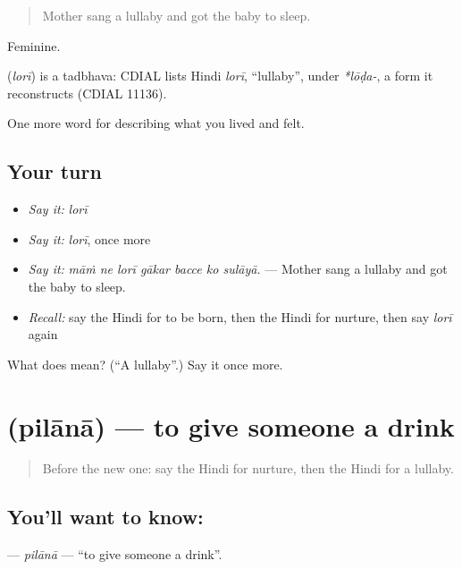 \begin{quote}
Mother sang a lullaby and got the baby to sleep.
\end{quote}

Feminine.

\begin{cousinweb}
\textbf{} (\emph{lorī}) is a tadbhava: CDIAL lists Hindi \emph{lorī}, \textquotedblleft{}lullaby\textquotedblright{}, under \emph{*lōḍa-}, a form it reconstructs (CDIAL 11136).
\end{cousinweb}

\begin{grammarlens}[title={What you've built}]
One more word for describing what you lived and felt.
\end{grammarlens}

\subsection*{Your turn}
\begin{itemize}
\raggedright
  \item \emph{Say it:} \emph{lorī}
  \item \emph{Say it:} \emph{lorī}, once more
  \item \emph{Say it:} \emph{māṁ ne lorī gākar bacce ko sulāyā.} — Mother sang a lullaby and got the baby to sleep.
  \item \emph{Recall:} say the Hindi for to be born, then the Hindi for nurture, then say \emph{lorī} again
\end{itemize}

\begin{tcolorbox}[breakable,colback=teal!4,colframe=teal!35!black,title={Before you move on}]
What does  mean? (\textquotedblleft{}A lullaby\textquotedblright{}.) Say it once more.
\end{tcolorbox}
\section[\texorpdfstring{\hi{पिलाना} (pilānā)}{पिलाना (pilānā)}]{ (pilānā) — to give someone a drink}

\label{lesson:HI-C498-pilana}



\begin{quote}
Before the new one: say the Hindi for nurture, then the Hindi for a lullaby.
\end{quote}

\subsection*{You'll want to know: }
\textbf{} — \emph{pilānā} — \textquotedblleft{}to give someone a drink\textquotedblright{}.

